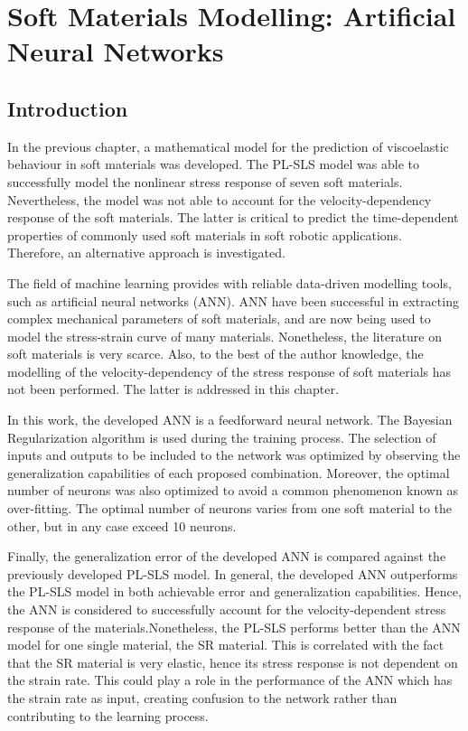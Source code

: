 \chapter{Soft Materials Modelling: Artificial Neural Networks}

\section{Introduction} 

In the previous chapter, a mathematical model for the prediction of viscoelastic behaviour in soft materials was developed. The PL-SLS model was able to successfully model the nonlinear stress response of seven soft materials. Nevertheless, the model was not able to account for the velocity-dependency response of the soft materials. The latter is critical to predict the time-dependent properties of commonly used soft materials in soft robotic applications. Therefore, an alternative approach is investigated.

The field of machine learning provides with reliable data-driven modelling tools, such as artificial neural networks (ANN). ANN have been successful in extracting complex mechanical parameters of soft materials, and are now being used to model the stress-strain curve of many materials. Nonetheless, the literature on soft materials is very scarce. Also, to the best of the author knowledge, the modelling of the velocity-dependency of the stress response of soft materials has not been performed. The latter is addressed in this chapter.

In this work, the developed ANN is a feedforward neural network. The Bayesian Regularization algorithm is used during the training process. The selection of inputs and outputs to be included to the network was optimized by observing the generalization capabilities of each proposed combination. Moreover, the optimal number of neurons was also optimized to avoid a common phenomenon known as over-fitting. The optimal number of neurons varies from one soft material to the other, but in any case exceed 10 neurons.

Finally, the generalization error of the developed ANN is compared against the previously developed PL-SLS model. In general, the developed ANN outperforms the PL-SLS model in both achievable error and generalization capabilities. Hence, the ANN is considered to successfully account for the velocity-dependent stress response of the materials.Nonetheless, the PL-SLS performs better than the ANN model for one single material, the SR material. This is correlated with the fact that the SR material is very elastic, hence its stress response is not dependent on the strain rate. This could play a role in the performance of the ANN which has the strain rate as input, creating confusion to the network rather than contributing to the learning process.

